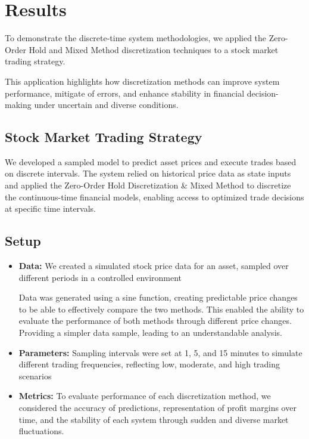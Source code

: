 \documentclass{article}
\begin{document}
\section{Results}
To demonstrate the discrete-time system methodologies, we applied the Zero-Order Hold and Mixed Method discretization techniques to a stock market trading strategy. 

This application highlights how discretization methods can improve system performance, mitigate of errors, and enhance stability in financial decision-making under uncertain and diverse conditions.

\subsection{Stock Market Trading Strategy}
We developed a sampled model to predict asset prices and execute trades based on discrete intervals. The system relied on historical price data as state inputs and applied the Zero-Order Hold Discretization \& Mixed Method to discretize the continuous-time financial models, enabling access to optimized trade decisions at specific time intervals.

\subsection{Setup}
\begin{itemize}
    \item \textbf{Data:} We created a simulated stock price data for an asset, sampled over different periods in a controlled environment

    Data was generated using a sine function, creating predictable price changes to be able to effectively compare the two methods. This enabled the ability to evaluate the performance of both methods through different price changes. Providing a simpler data sample, leading to an understandable analysis.
    \item \textbf{Parameters:} Sampling intervals were set at 1, 5, and 15 minutes to simulate different trading frequencies, reflecting low, moderate, and high trading scenarios
    
    \item \textbf{Metrics:} To evaluate performance of each discretization method, we considered the accuracy of predictions, representation of profit margins over time, and the stability of each system through sudden and diverse market fluctuations.
    
\end{itemize}
\end{document}
